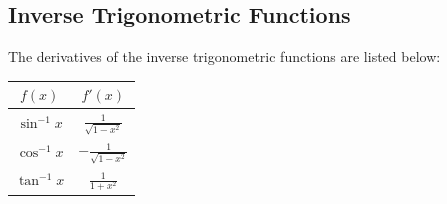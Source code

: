 \documentclass[12pt]{article}
\begin{document}
\subsection{Inverse Trigonometric Functions}
The derivatives of the inverse trigonometric functions are listed below:
\begin{center}
	\begin{tabular}{|c|c|}
		\hline
		$f(x)$ & $f'(x)$ \\
		\hline \hline
		$\sin^{-1} x$ & $\frac{1}{\sqrt{1-x^2}}$ \\
		\hline
		$\cos^{-1} x$ & $-\frac{1}{\sqrt{1-x^2}}$ \\
		\hline
		$\tan^{-1} x$ & $\frac{1}{1+x^2}$ \\
		\hline
	\end{tabular}
\end{center}
\end{document}
